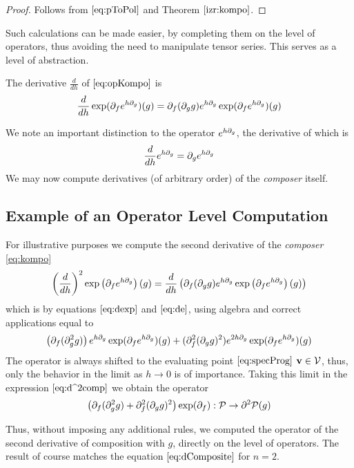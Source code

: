    \begin{proof}
   Follows from $\eqref{eq:pToPol}$ and Theorem $\ref{izr:kompo}$.
   \end{proof}

Such calculations can be made easier, by completing them on
the level of operators, thus avoiding the need to manipulate tensor series. This serves as a level of abstraction.

The derivative $\frac{d}{dh}$ of $\eqref{eq:opKompo}$ is 
 \begin{equation}\label{eq:dexp}
 \frac{d}{dh}\exp(\partial_fe^{h\partial_g})(g)=\partial_f(\partial_gg)e^{h\partial_g}\exp(\partial_fe^{h\partial_g})(g)
 \end{equation}
 
 We note an important distinction to the operator $e^{h\partial_g}$, the derivative of which is
 \begin{equation}\label{eq:de}
\frac{d}{dh}e^{h\partial_g}=\partial_ge^{h\partial_g}
 \end{equation}
 We may now compute derivatives (of arbitrary order) of the \emph{composer} itself.

\subsection{Example of an Operator Level Computation}\label{sec:example}

 For illustrative purposes we compute the second derivative of the \emph{composer} \eqref{eq:kompo}
 $$\left(\frac{d}{dh}\right)^2\exp\left(\partial_fe^{h\partial_g}\right)(g)=\frac{d}{dh}\left(\partial_f(\partial_gg)e^{h\partial_g}\exp\left(\partial_fe^{h\partial_g}\right)(g)\right)$$
 which is by equations $\eqref{eq:dexp}$ and $\eqref{eq:de}$, using algebra and correct applications equal to
 \begin{equation}\label{eq:d^2comp}
 \left(\partial_f(\partial^2_gg)\right)e^{h\partial_g}\exp(\partial_fe^{h\partial_g})(g)+(\partial^2_f(\partial_gg)^2)e^{2h\partial_g}\exp(\partial_fe^{h\partial_g})(g)
 \end{equation}
 The operator is always shifted to the evaluating point $\eqref{eq:specProg}$ $\mathbf{v}\in \mathcal{V}$, thus, only the behavior in the limit as $h\to 0$ is of importance. Taking this limit in the expression $\eqref{eq:d^2comp}$ we obtain the operator
 \begin{equation*}
  \left(\partial_f(\partial^2_gg)+\partial^2_f(\partial_gg)^2\right)\exp(\partial_f):\mathcal{P}\to\partial^2\mathcal{P}(g)
 \end{equation*}
 
 Thus, without imposing any additional rules, we computed the operator of the second derivative of composition with $g$, directly on the level of operators. The result of course matches the equation $\eqref{eq:dComposite}$ for $n=2$.
 
